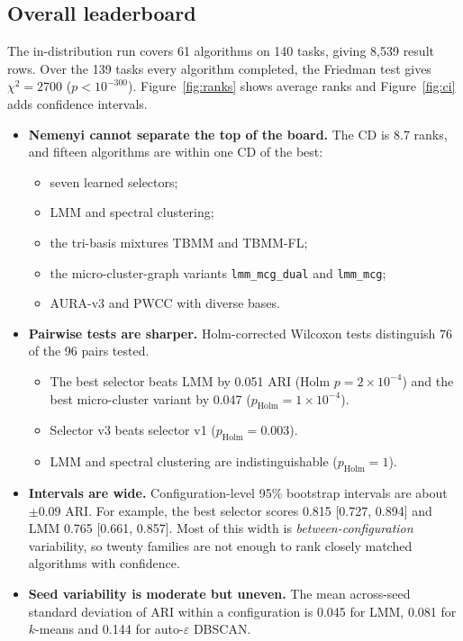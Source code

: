 \documentclass[11pt,a4paper]{article}
\newcommand{\code}[1]{\texttt{#1}}
\begin{document}
\subsection{Overall leaderboard}
The in-distribution run covers 61 algorithms on 140 tasks, giving 8{,}539
result rows. Over the 139 tasks every algorithm completed, the Friedman test
gives $\chi^2 = 2700$ ($p < 10^{-300}$). Figure~\ref{fig:ranks} shows average
ranks and Figure~\ref{fig:ci} adds confidence intervals.
\begin{itemize}
  \item \textbf{Nemenyi cannot separate the top of the board.} The CD is 8.7
  ranks, and fifteen algorithms are within one CD of the best:
  \begin{itemize}
    \item seven learned selectors;
    \item LMM and spectral clustering;
    \item the tri-basis mixtures TBMM and TBMM-FL;
    \item the micro-cluster-graph variants \code{lmm\_mcg\_dual} and
    \code{lmm\_mcg};
    \item AURA-v3 and PWCC with diverse bases.
  \end{itemize}
  \item \textbf{Pairwise tests are sharper.} Holm-corrected Wilcoxon tests
  distinguish 76 of the 96 pairs tested.
  \begin{itemize}
    \item The best selector beats LMM by 0.051 ARI (Holm $p = 2\times10^{-4}$)
    and the best micro-cluster variant by 0.047 ($p_\text{Holm} = 1\times10^{-4}$).
    \item Selector v3 beats selector v1 ($p_\text{Holm} = 0.003$).
    \item LMM and spectral clustering are indistinguishable
    ($p_\text{Holm} = 1$).
  \end{itemize}
  \item \textbf{Intervals are wide.} Configuration-level 95\% bootstrap
  intervals are about $\pm 0.09$ ARI. For example, the best selector scores
  0.815 [0.727, 0.894] and LMM 0.765 [0.661, 0.857]. Most of this width
  is \emph{between-configuration} variability, so twenty families are not
  enough to rank closely matched algorithms with confidence.
  \item \textbf{Seed variability is moderate but uneven.} The mean
  across-seed standard deviation of ARI within a configuration is 0.045 for
  LMM, 0.081 for $k$-means and 0.144 for auto-$\varepsilon$ DBSCAN.
\end{itemize}
\end{document}
